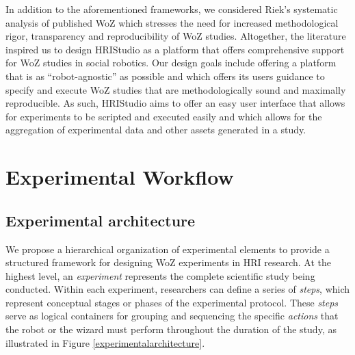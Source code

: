 \documentclass[letterpaper, 10 pt, conference]{ieeeconf}
\begin{document}
In addition to the aforementioned frameworks, we considered Riek's systematic analysis of published WoZ which stresses the need for increased methodological rigor, transparency and reproducibility of WoZ studies. \cite{Riek2012} Altogether, the literature inspired us to design HRIStudio as a platform that offers comprehensive support for WoZ studies in social robotics. Our design goals include offering a platform that is as ``robot-agnostic'' as possible and which offers its users guidance to specify and execute WoZ studies that are methodologically sound and maximally reproducible. As such, HRIStudio aims to offer an easy user interface that allows for experiments to be scripted and executed easily and which allows for the aggregation of experimental data and other assets generated in a study.

\section{Experimental Workflow}

\subsection{Experimental architecture}




We propose a hierarchical organization of experimental elements to provide a structured framework for designing WoZ experiments in HRI research. At the highest level, an \textit{experiment} represents the complete scientific study being conducted. Within each experiment, researchers can define a series of \textit{steps}, which represent conceptual stages or phases of the experimental protocol. These \textit{steps} serve as logical containers for grouping and sequencing the specific \textit{actions} that the robot or the wizard must perform throughout the duration of the study, as illustrated in Figure \ref{experimentalarchitecture}.
\end{document}
